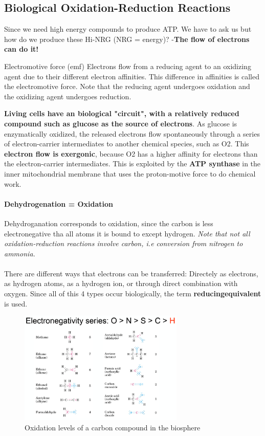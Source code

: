 \documentclass[../main.tex]{subfiles}
\begin{document}
\subsection{Biological Oxidation-Reduction Reactions}
Since we need high energy compounds to produce ATP. We have to ask us but how do we produce these Hi-NRG (NRG = energy)? -\textbf{The flow of electrons can do it!} 
\begin{DefWithTitle}{Electromotive force (emf)}
	Electrons flow from a reducing agent to an oxidizing agent due to their different electron affinities. This difference in affinities is called the electromotive force. Note that the reducing agent undergoes oxidation and the oxidizing agent undergoes reduction. 
\end{DefWithTitle}
\textbf{Living cells have an biological "circuit", with a relatively reduced compound such as glucose as the source of electrons}. As glucose is enzymatically oxidized, the released electrons flow spontaneously through a series of electron-carrier intermediates to another chemical species, such as O2. This \textbf{electron flow is exergonic}, because O2 has a higher affinity for electrons than the electron-carrier intermediates. This is exploited by the \textbf{ATP synthase} in the inner mitochondrial membrane that uses the proton-motive force to do chemical work. 

\paragraph{Dehydrogenation = Oxidation}
Dehydroganation corresponds to oxidation, since the carbon is less electronegative tha all atoms it is bound to except hydrogen. \textit{Note that not all oxidation-reduction reactions involve carbon, i.e conversion from nitrogen to ammonia.}\\
\\
There are different ways that electrons can be transferred: Directely as electrons, as hydrogen atoms, as a hydrogen ion, or through direct combination with oxygen. Since all of this 4 types occur biologically, the term \textbf{\gls{reducingequivalent}} is used.
 
\begin{figure}[H]
	\centering
	\includegraphics[width=0.7\textwidth]{reduction}
	\caption{Oxidation levels of a carbon compound in the biosphere}
\end{figure}
\end{document}
